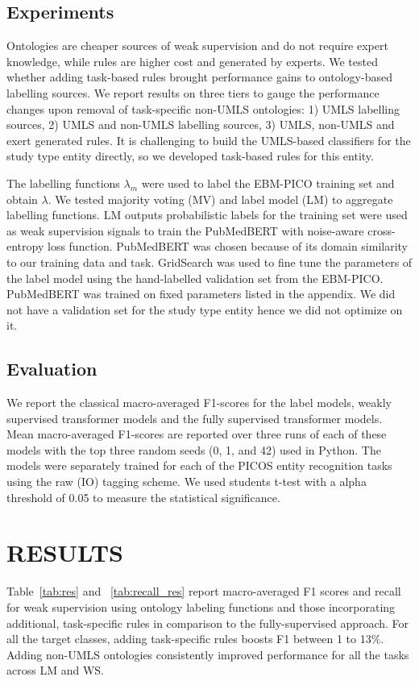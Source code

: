 \documentclass[10.7pt,]{article}
\begin{document}
\subsection{Experiments}\label{transformers}
%
Ontologies are cheaper sources of weak supervision and do not require expert knowledge, while rules are higher cost and generated by experts.
We tested whether adding task-based rules brought performance gains to ontology-based labelling sources.
We report results on three tiers to gauge the performance changes upon removal of task-specific non-UMLS ontologies: 1) UMLS labelling sources, 2) UMLS and non-UMLS labelling sources, 3) UMLS, non-UMLS and exert generated rules. 
It is challenging to build the UMLS-based classifiers for the study type entity directly, so we developed task-based rules for this entity.


The labelling functions $\lambda_{m}$ were used to label the EBM-PICO training set and obtain $\lambda$. 
We tested majority voting (MV) and label model (LM) to aggregate labelling functions.
LM outputs probabilistic labels for the training set were used as weak supervision signals to train the PubMedBERT with noise-aware cross-entropy loss function.
PubMedBERT was chosen because of its domain similarity to our training data and task.
GridSearch was used to fine tune the parameters of the label model using the hand-labelled validation set from the EBM-PICO. %
PubMedBERT was trained on fixed parameters listed in the appendix. %
We did not have a validation set for the study type entity hence we did not optimize on it.


%
%
%
\subsection{Evaluation}\label{eval}
%
We report the classical macro-averaged F1-scores for the label models, weakly supervised transformer models and the fully supervised transformer models.
Mean macro-averaged F1-scores are reported over three runs of each of these models with the top three random seeds (0, 1, and 42) used in Python.
The models were separately trained for each of the PICOS entity recognition tasks using the raw (IO) tagging scheme.
We used students t-test with a alpha threshold of 0.05 to measure the statistical significance.
%
%
%
\section{RESULTS}\label{results}
%
Table~\ref{tab:res} and ~\ref{tab:recall_res} report macro-averaged F1 scores and recall for weak supervision using ontology labeling functions and those incorporating additional, task-specific rules in comparison to the fully-supervised approach.
For all the target classes, adding task-specific rules boosts F1 between 1 to 13\%. 
Adding non-UMLS ontologies consistently improved performance for all the tasks across LM and WS.
\end{document}
